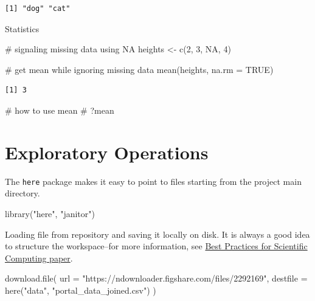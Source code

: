 \documentclass[
  letterpaper,
  DIV=11,
  numbers=noendperiod]{scrreprt}
\newenvironment{Shaded}{\begin{snugshade}}{\end{snugshade}}
\newcommand{\AttributeTok}[1]{\textcolor[rgb]{0.40,0.45,0.13}{#1}}
\newcommand{\CommentTok}[1]{\textcolor[rgb]{0.37,0.37,0.37}{#1}}
\newcommand{\ConstantTok}[1]{\textcolor[rgb]{0.56,0.35,0.01}{#1}}
\newcommand{\DecValTok}[1]{\textcolor[rgb]{0.68,0.00,0.00}{#1}}
\newcommand{\FunctionTok}[1]{\textcolor[rgb]{0.28,0.35,0.67}{#1}}
\newcommand{\NormalTok}[1]{\textcolor[rgb]{0.00,0.23,0.31}{#1}}
\newcommand{\OtherTok}[1]{\textcolor[rgb]{0.00,0.23,0.31}{#1}}
\newcommand{\StringTok}[1]{\textcolor[rgb]{0.13,0.47,0.30}{#1}}
\begin{document}
\begin{verbatim}
[1] "dog" "cat"
\end{verbatim}

Statistics

\begin{Shaded}
\begin{Highlighting}[]
\CommentTok{\# signaling missing data using NA}
\NormalTok{heights }\OtherTok{\textless{}{-}} \FunctionTok{c}\NormalTok{(}\DecValTok{2}\NormalTok{, }\DecValTok{3}\NormalTok{, }\ConstantTok{NA}\NormalTok{, }\DecValTok{4}\NormalTok{)}

\CommentTok{\# get mean while ignoring missing data}
\FunctionTok{mean}\NormalTok{(heights, }\AttributeTok{na.rm =} \ConstantTok{TRUE}\NormalTok{)}
\end{Highlighting}
\end{Shaded}

\begin{verbatim}
[1] 3
\end{verbatim}

\begin{Shaded}
\begin{Highlighting}[]
\CommentTok{\# how to use mean}
\CommentTok{\# ?mean}
\end{Highlighting}
\end{Shaded}

\section{Exploratory Operations}\label{exploratory-operations}

The \texttt{here} package makes it easy to point to files starting from
the project main directory.

\begin{Shaded}
\begin{Highlighting}[]
\FunctionTok{library}\NormalTok{(}\StringTok{"here"}\NormalTok{, }\StringTok{"janitor"}\NormalTok{)}
\end{Highlighting}
\end{Shaded}

Loading file from repository and saving it locally on disk. It is always
a good idea to structure the workspace--for more information, see
\href{http://journals.plos.org/plosbiology/article?id=10.1371/journal.pbio.1001745}{Best
Practices for Scientific Computing paper}.

\begin{Shaded}
\begin{Highlighting}[]
\FunctionTok{download.file}\NormalTok{(}
  \AttributeTok{url =} \StringTok{"https://ndownloader.figshare.com/files/2292169"}\NormalTok{,}
  \AttributeTok{destfile =} \FunctionTok{here}\NormalTok{(}\StringTok{"data"}\NormalTok{, }\StringTok{"portal\_data\_joined.csv"}\NormalTok{)}
\NormalTok{)}
\end{Highlighting}
\end{Shaded}
\end{document}
